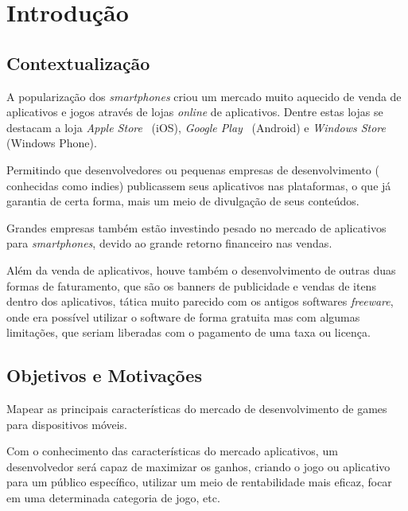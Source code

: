 
\chapter{Introdução}
\label{cap:introducao}


\section{Contextualização}

A popularização dos \emph{smartphones} criou um mercado muito aquecido de venda de aplicativos e jogos através de lojas \emph{online} de aplicativos. Dentre estas lojas se destacam a loja \emph{Apple Store}~\cite{appstore} (iOS), \emph{Google Play}~\cite{googleplay} (Android) e \emph{Windows Store} (Windows Phone).


Permitindo que desenvolvedores ou pequenas empresas de desenvolvimento ( conhecidas como indies) publicassem seus aplicativos nas plataformas, o que já garantia de certa forma, mais um meio de divulgação de seus conteúdos.


Grandes empresas também estão investindo pesado no mercado de aplicativos para \emph{smartphones}, devido ao grande retorno financeiro nas vendas.



Além da venda de aplicativos, houve também o desenvolvimento de outras duas formas de faturamento, que são os banners de publicidade e vendas de itens dentro dos aplicativos, tática muito parecido com os antigos softwares \emph{freeware}, onde era possível utilizar o software de forma gratuita mas com algumas limitações, que seriam liberadas com o pagamento de uma taxa ou licença.







\section{Objetivos e Motivações}


Mapear as principais características do mercado de desenvolvimento de games para dispositivos móveis. 

Com o conhecimento das características do mercado aplicativos, um desenvolvedor será capaz de maximizar os ganhos, criando o jogo ou aplicativo para um público específico, utilizar um meio de rentabilidade mais eficaz, focar em uma determinada categoria de jogo, etc.
 

